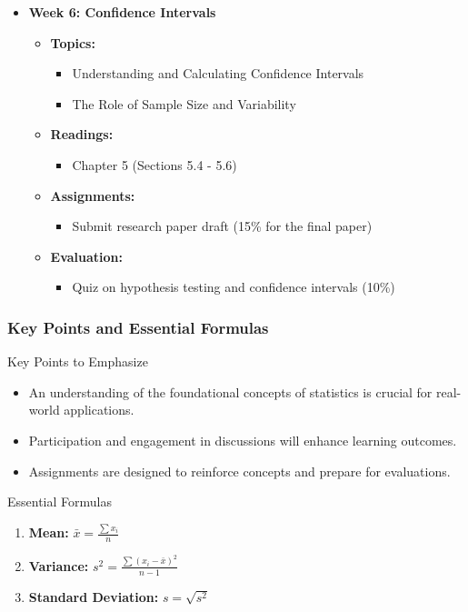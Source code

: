 \documentclass[aspectratio=169]{beamer}
\begin{document}
\begin{frame}[fragile]
\begin{itemize}
        \item \textbf{Week 6: Confidence Intervals}
        \begin{itemize}
            \item \textbf{Topics:}
                \begin{itemize}
                    \item Understanding and Calculating Confidence Intervals
                    \item The Role of Sample Size and Variability
                \end{itemize}
            \item \textbf{Readings:}
                \begin{itemize}
                    \item Chapter 5 (Sections 5.4 - 5.6)
                \end{itemize}
            \item \textbf{Assignments:}
                \begin{itemize}
                    \item Submit research paper draft (15\% for the final paper)
                \end{itemize}
            \item \textbf{Evaluation:}
                \begin{itemize}
                    \item Quiz on hypothesis testing and confidence intervals (10\%)
                \end{itemize}
        \end{itemize}
    \end{itemize}
\end{frame}

\begin{frame}[fragile]
    \frametitle{Key Points and Essential Formulas}
    \begin{block}{Key Points to Emphasize}
        \begin{itemize}
            \item An understanding of the foundational concepts of statistics is crucial for real-world applications.
            \item Participation and engagement in discussions will enhance learning outcomes.
            \item Assignments are designed to reinforce concepts and prepare for evaluations.
        \end{itemize}
    \end{block}

    \begin{block}{Essential Formulas}
        \begin{enumerate}
            \item \textbf{Mean:} \(\bar{x} = \frac{\sum x_i}{n}\)
            \item \textbf{Variance:} \(s^2 = \frac{\sum (x_i - \bar{x})^2}{n-1}\)
            \item \textbf{Standard Deviation:} \(s = \sqrt{s^2}\)
        \end{enumerate}
    \end{block}
\end{frame}
\end{document}
